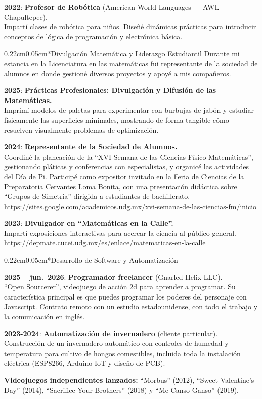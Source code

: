 \documentclass[10.5pt]{article}
\makeatletter
\renewcommand{\section}{\@startsection{section}{1}{0pt}%
  {0.22cm}{0.05cm}{\normalfont\large\bfseries}}
\makeatother
\begin{document}
\textbf{2022}: \textbf{Profesor de Robótica} (American World Languages --- AWL Chapultepec). \\
Impartí clases de robótica para niños. Diseñé dinámicas prácticas para introducir conceptos de lógica de programación y electrónica básica.

\section*{Divulgación Matemática y Liderazgo Estudiantil}
Durante mi estancia en la Licenciatura en las matemáticas fui representante de la sociedad de alumnos en donde gestioné diversos proyectos y apoyé a mis compañeros.

\textbf{2025}: \textbf{Prácticas Profesionales: Divulgación y Difusión de las Matemáticas.} \\
Imprimí modelos de paletas para experimentar con burbujas de jabón y estudiar físicamente las superficies minimales, mostrando de forma tangible cómo resuelven visualmente problemas de optimización.

\textbf{2024}: \textbf{Representante de la Sociedad de Alumnos.} \\
Coordiné la planeación de la ``XVI Semana de las Ciencias Físico-Matemáticas'', gestionando pláticas y conferencias con especialistas, y organicé las actividades del Día de Pi. Participé como expositor invitado en la Feria de Ciencias de la Preparatoria Cervantes Loma Bonita, con una presentación didáctica sobre ``Grupos de Simetría'' dirigida a estudiantes de bachillerato. \\
\url{https://sites.google.com/academicos.udg.mx/xvi-semana-de-las-ciencias-fm/inicio}

\textbf{2023}: \textbf{Divulgador en ``Matemáticas en la Calle''.} \\
Impartí exposiciones interactivas para acercar la ciencia al público general. \\
\url{https://depmate.cucei.udg.mx/es/enlace/matematicas-en-la-calle}

\section*{Desarrollo de Software y Automatización}

\textbf{2025 -- jun.\ 2026}: \textbf{Programador freelancer} (Gnarled Helix LLC). \\
``Open Sourcerer'', videojuego de acción 2d para aprender a programar. Su característica principal es que puedes programar los poderes del personaje con Javascript. Contrato remoto con un estudio estadounidense, con todo el trabajo y la comunicación en inglés.

\textbf{2023-2024}: \textbf{Automatización de invernadero} (cliente particular). \\
Construcción de un invernadero automático con controles de humedad y temperatura para cultivo de hongos comestibles, incluida toda la instalación eléctrica (ESP8266, Arduino IoT y diseño de PCB).

\textbf{Videojuegos independientes lanzados:} ``Morbus'' (2012), ``Sweet Valentine's Day'' (2014), ``Sacrifice Your Brothers'' (2018) y ``Me Canso Ganso'' (2019).
\end{document}
